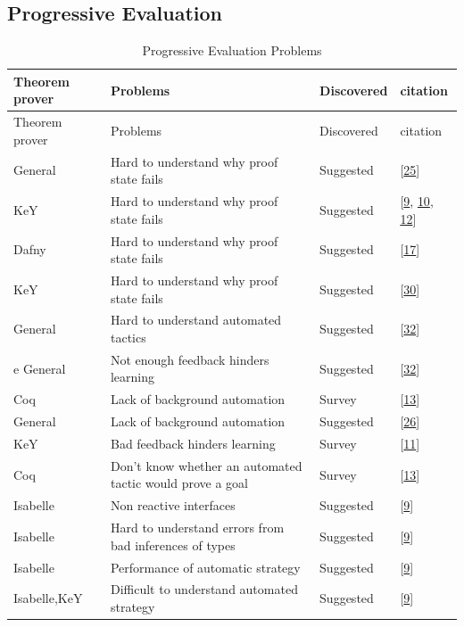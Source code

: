 \documentclass[
]{article}
\begin{document}
\hypertarget{progressive-evaluation-1}{%
\subsection{Progressive Evaluation}\label{progressive-evaluation-1}}

\hypertarget{tbl:progressive_evaluation}{}
\begin{longtable}[]{@{}llll@{}}
\caption{\label{tbl:progressive_evaluation}Progressive Evaluation
Problems}\tabularnewline
\toprule
Theorem prover & Problems & Discovered & citation \\
\midrule
\endfirsthead
\toprule
Theorem prover & Problems & Discovered & citation \\
\midrule
\endhead
General & Hard to understand why proof state fails & Suggested &
{[}\protect\hyperlink{ref-hentschel_interactive_2016}{25}{]} \\
KeY & Hard to understand why proof state fails & Suggested &
{[}\protect\hyperlink{ref-beckert_usability_2015}{9},
\protect\hyperlink{ref-beckert_interaction_2017}{10},
\protect\hyperlink{ref-beckert_interactive_2015}{12}{]} \\
Dafny & Hard to understand why proof state fails & Suggested &
{[}\protect\hyperlink{ref-grebing_seamless_2020}{17}{]} \\
KeY & Hard to understand why proof state fails & Suggested &
{[}\protect\hyperlink{ref-lin_understanding_2016}{30}{]} \\
General & Hard to understand automated tactics & Suggested &
{[}\protect\hyperlink{ref-mitsch_keymaera_2017}{32}{]} \\
e General & Not enough feedback hinders learning & Suggested &
{[}\protect\hyperlink{ref-mitsch_keymaera_2017}{32}{]} \\
Coq & Lack of background automation & Survey &
{[}\protect\hyperlink{ref-berman_development_2014}{13}{]} \\
General & Lack of background automation & Suggested &
{[}\protect\hyperlink{ref-hunter_agent-based_2005}{26}{]} \\
KeY & Bad feedback hinders learning & Survey &
{[}\protect\hyperlink{ref-beckert_evaluating_2012}{11}{]} \\
Coq & Don't know whether an automated tactic would prove a goal & Survey
& {[}\protect\hyperlink{ref-berman_development_2014}{13}{]} \\
Isabelle & Non reactive interfaces & Suggested &
{[}\protect\hyperlink{ref-beckert_usability_2015}{9}{]} \\
Isabelle & Hard to understand errors from bad inferences of types &
Suggested & {[}\protect\hyperlink{ref-beckert_usability_2015}{9}{]} \\
Isabelle & Performance of automatic strategy & Suggested &
{[}\protect\hyperlink{ref-beckert_usability_2015}{9}{]} \\
Isabelle,KeY & Difficult to understand automated strategy & Suggested &
{[}\protect\hyperlink{ref-beckert_usability_2015}{9}{]} \\
\bottomrule
\end{longtable}
\end{document}
